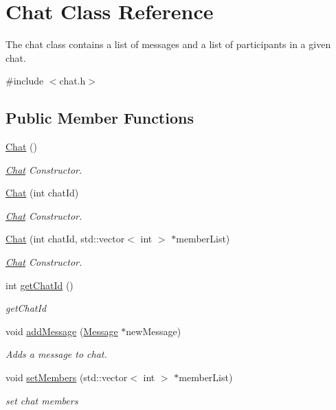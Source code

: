 \hypertarget{classChat}{}\section{Chat Class Reference}
\label{classChat}


The chat class contains a list of messages and a list of participants in a given chat.  




{\ttfamily \#include $<$chat.\+h$>$}

\subsection*{Public Member Functions}
\begin{DoxyCompactItemize}
\item 
\hyperlink{classChat_a4427e061b727c06cccca9626cc0cf9c8}{Chat} ()\hypertarget{classChat_a4427e061b727c06cccca9626cc0cf9c8}{}\label{classChat_a4427e061b727c06cccca9626cc0cf9c8}

\begin{DoxyCompactList}\small\item\em \hyperlink{classChat}{Chat} Constructor. \end{DoxyCompactList}\item 
\hyperlink{classChat_a911edde3a05c074f27da0172fe857d6c}{Chat} (int chat\+Id)
\begin{DoxyCompactList}\small\item\em \hyperlink{classChat}{Chat} Constructor. \end{DoxyCompactList}\item 
\hyperlink{classChat_a5ba0b562f6cb367891ea34d38d7f6634}{Chat} (int chat\+Id, std\+::vector$<$ int $>$ $\ast$member\+List)
\begin{DoxyCompactList}\small\item\em \hyperlink{classChat}{Chat} Constructor. \end{DoxyCompactList}\item 
int \hyperlink{classChat_a8e4444f24fb22a6db1b3cfbabaa2e0f0}{get\+Chat\+Id} ()
\begin{DoxyCompactList}\small\item\em get\+Chat\+Id \end{DoxyCompactList}\item 
void \hyperlink{classChat_a795ad989c7d8d5ec499a4166dd746edd}{add\+Message} (\hyperlink{classMessage}{Message} $\ast$new\+Message)
\begin{DoxyCompactList}\small\item\em Adds a message to chat. \end{DoxyCompactList}\item 
void \hyperlink{classChat_abe6350fda908d6cc5a437132e55600b9}{set\+Members} (std\+::vector$<$ int $>$ $\ast$member\+List)
\begin{DoxyCompactList}\small\item\em set chat members \end{DoxyCompactList}\end{DoxyCompactItemize}


